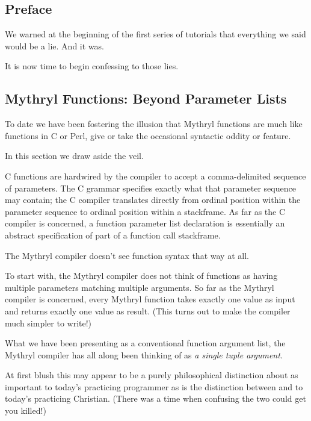 
\subsection{Preface}
\label{section:tut:fullmonte:preface}

We warned at the beginning of the first series of tutorials that 
everything we said would be a lie.  And it was.

It is now time to begin confessing to those lies.

\cutend*


\subsection{Mythryl Functions:  Beyond Parameter Lists}

To date we have been fostering the illusion that Mythryl functions are much 
like functions in C or Perl, give or take the occasional syntactic oddity 
or feature.

In this section we draw aside the veil.

C functions are hardwired by the compiler to accept a 
comma-delimited sequence of parameters.  The C grammar specifies exactly 
what that parameter sequence may contain;  the C compiler translates 
directly from ordinal position within the parameter sequence to ordinal 
position within a stackframe.  As far as the C compiler is concerned, a 
function parameter list declaration is essentially an abstract specification 
of part of a function call stackframe.

The Mythryl compiler doesn't see function syntax that way at all.

To start with, the Mythryl compiler does not think of functions as having 
multiple parameters matching multiple arguments.  So far as the Mythryl 
compiler is concerned, every Mythryl function takes exactly one value 
as input and returns exactly one value as result.  (This turns out to make 
the compiler much simpler to write!)

What we have been presenting as a conventional function argument list,
the Mythryl compiler has all along been thinking of as {\it a single tuple 
argument}.

At first blush this may appear to be a purely philosophical distinction about 
as important to today's practicing programmer as is the distinction between 
 and  to 
today's practicing Christian.  (There was a time when confusing the two 
could get you killed!)

